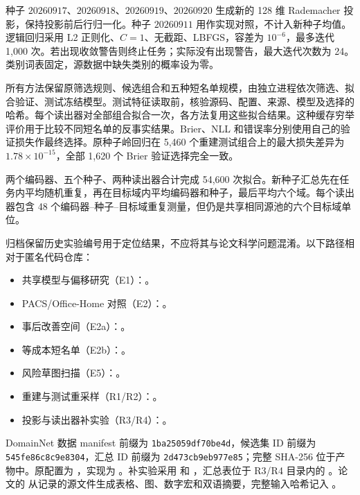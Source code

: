 种子 $20260917$、$20260918$、$20260919$、$20260920$ 生成新的 128 维 Rademacher 投影，保持投影前后行归一化。种子 $20260911$ 用作实现对照，不计入新种子均值。逻辑回归采用 L2 正则化、$C=1$、无截距、LBFGS，容差为 $10^{-6}$，最多迭代 1,000 次。若出现收敛警告则终止任务；实际没有出现警告，最大迭代次数为 24。类别词表固定，源数据中缺失类别的概率设为零。

所有方法保留原筛选规则、候选组合和五种短名单规模，由独立进程依次筛选、拟合验证、测试冻结模型。测试特征读取前，核验源码、配置、来源、模型及选择的哈希。每个读出器对全部组合拟合一次，各方法复用这些拟合结果。这种缓存穷举评价用于比较不同短名单的反事实结果。Brier、NLL 和错误率分别使用自己的验证损失作最终选择。原种子岭回归在 5,460 个重建测试组合上的最大损失差异为 $1.78\times10^{-15}$，全部 1,620 个 Brier 验证选择完全一致。

两个编码器、五个种子、两种读出器合计完成 54,600 次拟合。新种子汇总先在任务内平均随机重复，再在目标域内平均编码器和种子，最后平均六个域。每个读出器包含 48 个编码器--种子--目标域重复测量，但仍是共享相同源池的六个目标域单位。

归档保留历史实验编号用于定位结果，不应将其与论文科学问题混淆。以下路径相对于匿名代码仓库：
\begin{itemize}
\item 共享模型与偏移研究（E1）：。
\item PACS/Office-Home 对照（E2）：。
\item 事后改善空间（E2a）：。
\item 等成本短名单（E2b）：。
\item 风险草图扫描（E5）：。
\item 重建与测试重采样（R1/R2）：。
\item 投影与读出器补实验（R3/R4）：。
\end{itemize}
{\raggedright
DomainNet 数据 manifest 前缀为 \texttt{1ba25059df70be4d}，候选集 ID 前缀为 \texttt{545fe86c8c9e8304}，汇总 ID 前缀为 \texttt{2d473cb9eb977e85}；完整 SHA-256 位于产物中。原配置为 ，实现为 。补实验采用  和 ，汇总表位于 R3/R4 目录内的 。论文的  从记录的源文件生成表格、图、数字宏和双语摘要，完整输入哈希记入 。\par}

